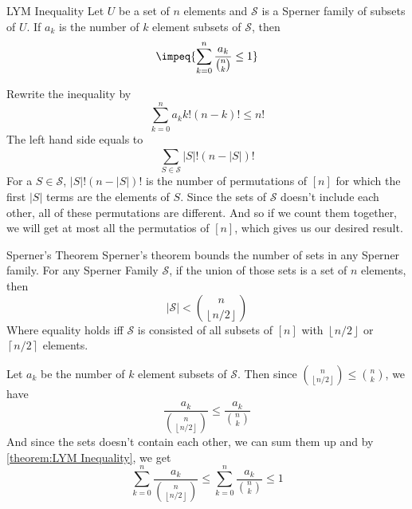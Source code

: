 



{LYM Inequality}{
    Let $U$ be a set of $n$ elements and $\mathcal{S}$ is a Sperner family of
    subsets of $U$. If $a_k$ is the number of $k$ element subsets of
    $\mathcal{S}$, then
    \[\impeq{\sum^{n}_{k=0}\frac{a_k}{{n \choose k}}\le 1}\] 
}

\begin{prooof}
    Rewrite the inequality by 
    \[\sum^{n}_{k=0} a_k k!(n-k)! \le n!\]
    The left hand side equals to 
    \[\sum^{}_{S\in \mathcal{S}} \left|S\right|!
    \left(n-\left|S\right|\right)!\] 
    For a $S \in \mathcal{S}$, $\left|S\right|!\left(n-\left|S\right|\right)!$
    is the number of permutations of $[n]$ for which the first
    $\left|S\right|$ terms are the elements of $S$. Since the sets of
    $\mathcal{S}$ doesn't include each other, all of these permutations are
    different. And so if we count them together, we will get at most all the
    permutatios of $[n]$, which gives us our desired result.
\end{prooof}


{Sperner's Theorem}{
    Sperner's theorem bounds the number of sets in any Sperner family. For any
    Sperner Family $\mathcal{S}$, if the union of those sets is a set of $n$
    elements, then 
    \[\left|\mathcal{S}\right|< {n \choose \left\lfloor n/2 \right\rfloor}\] 
    Where equality holds iff $\mathcal{S}$ is consisted of all subsets of
    $[n]$ with $\left\lfloor n/2 \right\rfloor$ or $\left\lceil
    n/2  \right\rceil $ elements.
}

\begin{prooof}
    Let $a_k$ be the number of $k$ element subsets of $\mathcal{S}$. Then
    since ${n\choose \left\lfloor n/2\right\rfloor} \le {n\choose k}$, we have
    \[\frac{a_k}{{n \choose \left\lfloor n/2\right\rfloor}} \le
    \frac{a_k}{{n\choose k}}\] 
    And since the sets doesn't contain each other, we can sum them up and by
    \autoref{theorem:LYM Inequality}, we get
    \[\sum^{n}_{k=0} \frac{a_k}{{n\choose \left\lfloor
    n/2\right\rfloor}} \le \sum^{n}_{k=0} \frac{a_k}{{n\choose k}} \le 1\] 
\end{prooof}





